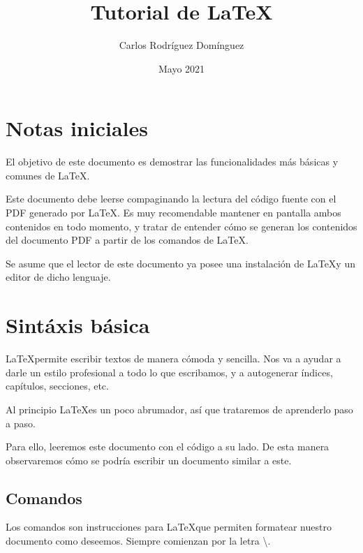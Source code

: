 \documentclass[12pt]{book} %
\title{Tutorial de \LaTeX}
\author{Carlos Rodríguez Domínguez}
\date{Mayo 2021}
\begin{document}
\frontmatter %
\maketitle %
\tableofcontents %

\chapter*{Notas iniciales}

El objetivo de este documento es demostrar las funcionalidades más básicas y comunes de \LaTeX.

Este documento debe leerse compaginando la lectura del código fuente con el PDF generado por \LaTeX. Es muy recomendable mantener en pantalla ambos contenidos en todo momento, y tratar de entender  cómo se generan los contenidos del documento PDF a partir de los comandos de \LaTeX.

Se asume que el lector de este documento ya posee una instalación de \LaTeX y un editor de dicho lenguaje.

\mainmatter %

\chapter{Sintáxis básica}

\LaTeX permite escribir textos de manera cómoda y sencilla.  Nos va a ayudar a darle un estilo profesional a todo lo que escribamos, y a autogenerar índices,  capítulos,  secciones, etc.

Al principio \LaTeX es un poco abrumador, así que trataremos de aprenderlo paso a paso.

Para ello, leeremos este documento con el código a su lado. De esta manera observaremos cómo se podría escribir un documento similar a este.

\section{Comandos}

Los comandos son instrucciones para \LaTeX que permiten formatear nuestro documento como deseemos. Siempre comienzan por la letra \textbackslash.
\end{document}
